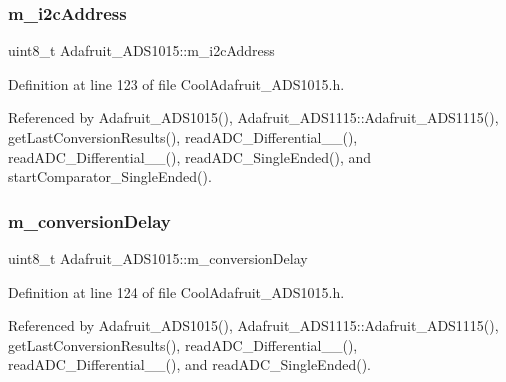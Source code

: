 \subsubsection{\texorpdfstring{m\+\_\+i2c\+Address}{m\_i2cAddress}}
{\footnotesize\ttfamily uint8\+\_\+t Adafruit\+\_\+\+A\+D\+S1015\+::m\+\_\+i2c\+Address\hspace{0.3cm}{\ttfamily [protected]}}



Definition at line 123 of file Cool\+Adafruit\+\_\+\+A\+D\+S1015.\+h.



Referenced by Adafruit\+\_\+\+A\+D\+S1015(), Adafruit\+\_\+\+A\+D\+S1115\+::\+Adafruit\+\_\+\+A\+D\+S1115(), get\+Last\+Conversion\+Results(), read\+A\+D\+C\+\_\+\+Differential\+\_\+\_(), read\+A\+D\+C\+\_\+\+Differential\+\_\+\_(), read\+A\+D\+C\+\_\+\+Single\+Ended(), and start\+Comparator\+\_\+\+Single\+Ended().

\mbox{\label{class_adafruit___a_d_s1015_aa3a29a64a6705fce1fee21d73c642a0e}} 
\subsubsection{\texorpdfstring{m\+\_\+conversion\+Delay}{m\_conversionDelay}}
{\footnotesize\ttfamily uint8\+\_\+t Adafruit\+\_\+\+A\+D\+S1015\+::m\+\_\+conversion\+Delay\hspace{0.3cm}{\ttfamily [protected]}}



Definition at line 124 of file Cool\+Adafruit\+\_\+\+A\+D\+S1015.\+h.



Referenced by Adafruit\+\_\+\+A\+D\+S1015(), Adafruit\+\_\+\+A\+D\+S1115\+::\+Adafruit\+\_\+\+A\+D\+S1115(), get\+Last\+Conversion\+Results(), read\+A\+D\+C\+\_\+\+Differential\+\_\+\_(), read\+A\+D\+C\+\_\+\+Differential\+\_\+\_(), and read\+A\+D\+C\+\_\+\+Single\+Ended().

\mbox{\label{class_adafruit___a_d_s1015_ab238ce17112a78db2be4ea14d57fb114}} 
